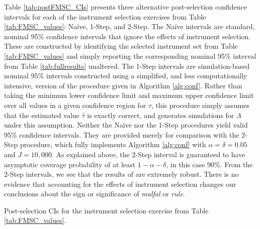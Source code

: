 Table \ref{tab:postFMSC_CIs} presents three alternative post-selection confidence intervals for each of the instrument selection exercises from Table \ref{tab:FMSC_values}: Na\"{i}ve, 1-Step, and 2-Step.
The Na\"{i}ve intervals are standard, nominal 95\% confidence intervals that ignore the effects of instrument selection.
These are constructed by identifying the selected instrument set from Table \ref{tab:FMSC_values} and simply reporting the corresponding nominal 95\% interval from Table \ref{tab:fullresults} unaltered.
The 1-Step intervals are simulation-based nominal 95\% intervals constructed using a simplified, and less computationally intensive, version of the procedure given in Algorithm \ref{alg:conf}.
Rather than taking the minimum lower confidence limit and maximum upper confidence limit over all values in a given confidence region for $\tau$, this procedure simply assumes that the estimated value $\widehat{\tau}$ is exactly correct, and generates simulations for $\Lambda$ under this assumption.
Neither the Na\"{i}ve nor the 1-Step procedures yield valid 95\% confidence intervals.
They are provided merely for comparison with the 2-Step procedure, which fully implements Algorithm \ref{alg:conf} with $\alpha = \delta = 0.05$ and $J=10,000$. 
As explained above, the 2-Step interval is guaranteed to have asymptotic coverage probability of at least $1 - \alpha - \delta$, in this case 90\%.
From the 2-Step intervals, we see that the results of \cite{Carstensen2006} are extremely robust. 
There is no evidence that accounting for the effects of instrument selection changes our conclusions about the sign or significance of \emph{malfal} or \emph{rule}.

\begin{table}[htbp]
	\centering
	
	\caption{Post-selection CIs for the instrument selection exercise from Table \ref{tab:FMSC_values}.}
	\label{tab:postFMSC_CIs}
\end{table}

